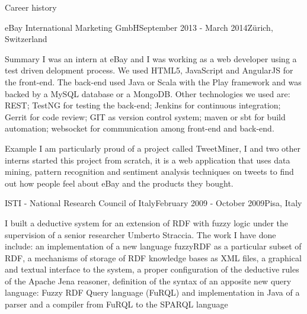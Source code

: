 \documentclass{resume}
\begin{document}
\begin{rSection}{Career history}
    \begin{rSubsection}{eBay International Marketing GmbH}{September 2013 - March 2014}{}{Z\"urich, Switzerland}
	  \item[Summary]  
	    I was an intern at eBay and I was working as a web developer using a test driven delopment process. 
	    We used HTML5, JavaScript and AngularJS for the front-end. 
	    The back-end used Java or Scala with the Play framework and was backed by a MySQL database or a MongoDB. 
	    Other technologies we used are: 
	        REST;
	    	TestNG for testing the back-end; 
		Jenkins for continuous integration; 
		Gerrit for code review; 
	    	GIT as version control system; 
		maven or sbt for build automation;
		websocket for communication among front-end and back-end.	  
	  \item[Example]
	    I am particularly proud of a project called TweetMiner, 
	    I and two other interns started this project from scratch,
	    it is a web application that uses data mining, pattern recognition and sentiment analysis techniques on tweets to find out how people feel about eBay and the products they bought. 
    \end{rSubsection}

    \begin{rSubsection}{ISTI - National Research Council of Italy}{February 2009 - October 2009}{}{Pisa, Italy}
      \item
	I built a deductive system for an extension of RDF with fuzzy logic under the supervision of a senior researcher Umberto Straccia.
	The work I have done include:
	an implementation of a new language fuzzyRDF as a particular subset of RDF,
        a mechanisms of storage of RDF knowledge bases as XML files,
        a graphical and textual interface to the system,
	a proper configuration of the deductive rules of the Apache Jena reasoner,
        definition of the syntax of an apposite new query language: Fuzzy RDF Query language (FuRQL)
	and implementation in Java of a parser and a compiler from FuRQL to the SPARQL language \\ 
    \end{rSubsection}
  \end{rSection}
\end{document}
